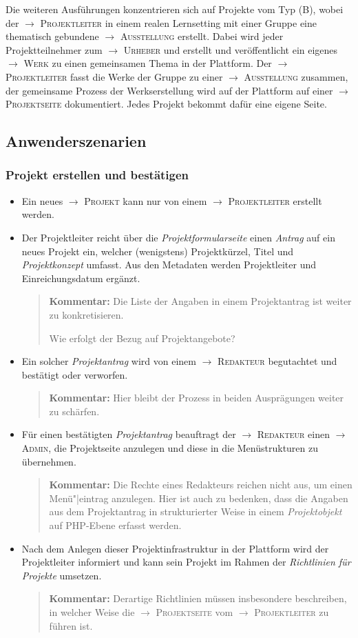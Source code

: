 \documentclass[a4paper,11pt]{article}
\newcommand{\Kommentar}[1]{
  \begin{quote}\textbf{Kommentar:} #1 \end{quote}
}
\newcommand{\glossar}[1]{{$\to$ \textsc{#1}}}
\begin{document}
Die weiteren Ausführungen konzentrieren sich auf Projekte vom Typ (B), wobei
der \glossar{Projektleiter} in einem realen Lernsetting mit einer Gruppe eine
thematisch gebundene \glossar{Ausstellung} erstellt. Dabei wird jeder
Projektteilnehmer zum \glossar{Urheber} und erstellt und veröffentlicht ein
eigenes \glossar{Werk} zu einen gemeinsamen Thema in der Plattform. Der
\glossar{Projektleiter} fasst die Werke der Gruppe zu einer
\glossar{Ausstellung} zusammen, der gemeinsame Prozess der Werkserstellung wird
auf der Plattform auf einer \glossar{Projektseite} dokumentiert. Jedes Projekt
bekommt dafür eine eigene Seite.

\subsection{Anwenderszenarien}

\subsubsection*{Projekt erstellen und bestätigen}

\begin{itemize}
\item Ein neues \glossar{Projekt} kann nur von einem \glossar{Projektleiter}
  erstellt werden.
\item Der Projektleiter reicht über die \emph{Projektformularseite} einen
  \emph{Antrag} auf ein neues Projekt ein, welcher (wenigstens) Projektkürzel,
  Titel und \emph{Projektkonzept} umfasst. Aus den Metadaten werden
  Projektleiter und Einreichungsdatum ergänzt.

\Kommentar{Die Liste der Angaben in einem Projektantrag ist weiter zu
  konkretisieren. 

  Wie erfolgt der Bezug auf Projektangebote? }

\item Ein solcher \emph{Projektantrag} wird von einem \glossar{Redakteur}
  begutachtet und bestätigt oder verworfen.

\Kommentar{Hier bleibt der Prozess in beiden Ausprägungen weiter zu schärfen. }

\item Für einen bestätigten \emph{Projektantrag} beauftragt der
  \glossar{Redakteur} einen \glossar{Admin}, die Projektseite anzulegen und
  diese in die Menüstrukturen zu übernehmen.

\Kommentar{Die Rechte eines Redakteurs reichen nicht aus, um einen
  Menü"|eintrag anzulegen. Hier ist auch zu bedenken, dass die Angaben aus dem
  Projektantrag in strukturierter Weise in einem \emph{Projektobjekt} auf
  PHP-Ebene erfasst werden. }

\item Nach dem Anlegen dieser Projektinfrastruktur in der Plattform wird der
  Projektleiter informiert und kann sein Projekt im Rahmen der
  \emph{Richtlinien für Projekte} umsetzen. 

\Kommentar{Derartige Richtlinien müssen insbesondere beschreiben, in welcher
  Weise die \glossar{Projektseite} vom \glossar{Projektleiter} zu führen ist. }

\end{itemize}
\end{document}
